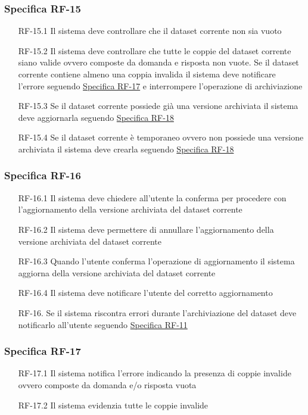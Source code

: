 \subsubsection{Specifica RF-15}
\label{subsubsec:RF-15}
\begin{enumerate}
    \item[RF-15.1] Il sistema deve controllare che il dataset corrente non sia vuoto
    \item[RF-15.2] Il sistema deve controllare che tutte le coppie del dataset corrente siano valide ovvero composte da domanda e risposta non vuote.
    Se il dataset corrente contiene almeno una coppia invalida il sistema deve notificare l'errore seguendo \hyperref[subsubsec:RF-17]{Specifica RF-17} e interrompere l'operazione di archiviazione
    \item[RF-15.3] Se il dataset corrente possiede già una versione archiviata il sistema deve aggiornarla seguendo \hyperref[subsubsec:RF-18]{Specifica RF-18}
    \item[RF-15.4] Se il dataset corrente è temporaneo ovvero non possiede una versione archiviata il sistema deve crearla seguendo \hyperref[subsubsec:RF-18]{Specifica RF-18} 
\end{enumerate}

\subsubsection{Specifica RF-16}
\label{subsubsec:RF-16}
\begin{enumerate}
    \item[RF-16.1] Il sistema deve chiedere all'utente la conferma per procedere con l'aggiornamento della versione archiviata del dataset corrente 
    \item[RF-16.2] Il sistema deve permettere di annullare l'aggiornamento della versione archiviata del dataset corrente 
    \item[RF-16.3] Quando l'utente conferma l'operazione di aggiornamento il sistema aggiorna della versione archiviata del dataset corrente 
    \item[RF-16.4] Il sistema deve notificare l'utente del corretto aggiornamento
    \item[RF-16.] Se il sistema riscontra errori durante l'archiviazione del dataset deve notificarlo all'utente seguendo \hyperref[subsubsec:RF-11]{Specifica RF-11}
\end{enumerate}

\subsubsection{Specifica RF-17}
\label{subsubsec:RF-17}
\begin{enumerate}
    \item[RF-17.1] Il sistema notifica l'errore indicando la presenza di coppie invalide ovvero composte da domanda e/o risposta vuota
    \item[RF-17.2] Il sistema evidenzia tutte le coppie invalide
\end{enumerate}

